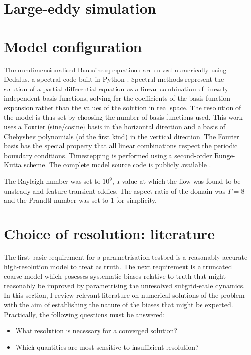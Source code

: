 \documentclass[../main.tex]{subfiles}
\begin{document}
\section{Large-eddy simulation}


\section{Model configuration}
The nondimensionalised Boussinesq equations
 are solved numerically using
Dedalus, a spectral code built in Python \parencite{burns2020}. Spectral
methods represent the solution of a partial differential equation as a linear
combination of linearly independent basis functions, solving for the
coefficients of the basis function expansion rather than the values of the
solution in real space. The resolution of the model is thus set by choosing the
number of basis functions used. This work uses a Fourier (sine/cosine) basis in
the horizontal direction and a basis of Chebyshev polynomials (of the first
kind) in the vertical direction. The Fourier basis has the special property
that all linear combinations respect the periodic boundary conditions.
Timestepping is performed using a second-order Runge-Kutta scheme. The complete
model source code is publicly available .

The Rayleigh number was set to $10^9$, a value at which the flow was found to
be unsteady and feature transient eddies. The aspect ratio of the domain was
$\Gamma = 8$ and the Prandtl number was set to $1$ for simplicity.



\section{Choice of resolution: literature}


The first basic requirement for a parametrisation testbed is a reasonably
accurate high-resolution model to treat as truth. The next requirement is a
truncated coarse model which posesses systematic biases relative to truth that
might reasonably be improved by parametrising the unresolved subgrid-scale
dynamics. In this section, I review relevant literature on numerical solutions
of the \rb{} problem with the aim of establishing the nature of the biases that
might be expected. Practically, the following questions must be answered:
\begin{itemize}
    \item What resolution is necessary for a converged solution?
    \item Which quantities are most sensitive to insufficient resolution?
\end{itemize}
\end{document}
